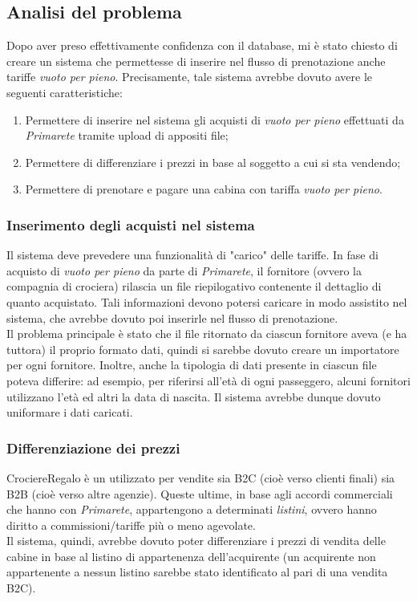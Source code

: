 \subsection{Analisi del problema}
Dopo aver preso effettivamente confidenza con il database, mi è stato chiesto di creare un sistema che permettesse di inserire nel flusso di prenotazione anche tariffe \textit{vuoto per pieno}. Precisamente, tale sistema avrebbe dovuto avere le seguenti caratteristiche:
\begin{enumerate}
	\item Permettere di inserire nel sistema gli acquisti di \textit{vuoto per pieno} effettuati da \textit{Primarete} tramite upload di appositi file;
	\item Permettere di differenziare i prezzi in base al soggetto a cui si sta vendendo;
	\item Permettere di prenotare e pagare una cabina con tariffa \textit{vuoto per pieno}.
\end{enumerate}

\subsubsection{Inserimento degli acquisti nel sistema}
Il sistema deve prevedere una funzionalità di "carico" delle tariffe. In fase di acquisto di \textit{vuoto per pieno} da parte di \textit{Primarete}, il fornitore (ovvero la compagnia di crociera) rilascia un file riepilogativo contenente il dettaglio di quanto acquistato. Tali informazioni devono potersi caricare in modo assistito nel sistema, che avrebbe dovuto poi inserirle nel flusso di prenotazione.\\
Il problema principale è stato che il file ritornato da ciascun fornitore aveva (e ha tuttora) il proprio formato dati, quindi si sarebbe dovuto creare un importatore per ogni fornitore. Inoltre, anche la tipologia di dati presente in ciascun file poteva differire: ad esempio, per riferirsi all'età di ogni passeggero, alcuni fornitori utilizzano l'età ed altri la data di nascita. Il sistema avrebbe dunque dovuto uniformare i dati caricati.

\subsubsection{Differenziazione dei prezzi}
CrociereRegalo è un \bookingEngine\hphantom{i}utilizzato per vendite sia B2C (cioè verso clienti finali) sia B2B (cioè verso altre agenzie). Queste ultime, in base agli accordi commerciali che hanno con \textit{Primarete}, appartengono a determinati \textit{listini}, ovvero hanno diritto a commissioni/tariffe più o meno agevolate.\\Il sistema, quindi, avrebbe dovuto poter differenziare i prezzi di vendita delle cabine in base al listino di appartenenza dell'acquirente (un acquirente non appartenente a nessun listino sarebbe stato identificato al pari di una vendita B2C).


